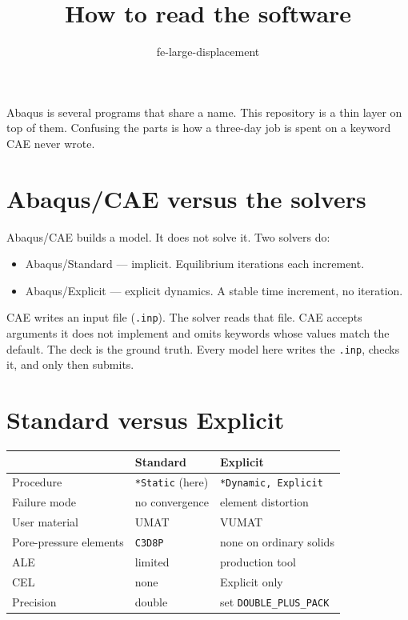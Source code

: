 \documentclass[11pt,a4paper]{article}
\title{\textbf{How to read the software}}
\author{fe-large-displacement}
\date{}
\begin{document}
\maketitle
\thispagestyle{fancy}

\noindent
Abaqus is several programs that share a name. This repository is a thin layer
on top of them. Confusing the parts is how a three-day job is spent on a
keyword CAE never wrote.

\section{Abaqus/CAE versus the solvers}

Abaqus/CAE builds a model. It does not solve it. Two solvers do:

\begin{itemize}
  \item Abaqus/Standard --- implicit. Equilibrium iterations each increment.
  \item Abaqus/Explicit --- explicit dynamics. A stable time increment, no
        iteration.
\end{itemize}

CAE writes an input file (\texttt{.inp}). The solver reads that file. CAE
accepts arguments it does not implement and omits keywords whose values match
the default. The deck is the ground truth. Every model here writes the
\texttt{.inp}, checks it, and only then submits.

\section{Standard versus Explicit}

\begin{center}
\small
\begin{tabular}{@{}lll@{}}
\toprule
 & Standard & Explicit \\
\midrule
Procedure & \texttt{*Static} (here) & \texttt{*Dynamic, Explicit} \\
Failure mode & no convergence & element distortion \\
User material & UMAT & VUMAT \\
Pore-pressure elements & \texttt{C3D8P} & none on ordinary solids \\
ALE & limited & production tool \\
CEL & none & Explicit only \\
Precision & double & set \texttt{DOUBLE\_PLUS\_PACK} \\
\bottomrule
\end{tabular}
\end{center}
\end{document}
